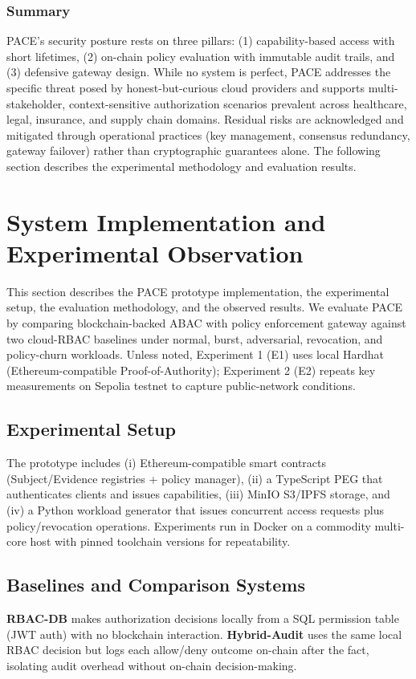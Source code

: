 \documentclass[pdflatex,sn-mathphys-num]{sn-jnl}
\begin{document}
\subsubsection{Summary}
PACE's security posture rests on three pillars: (1) capability-based access with short lifetimes, (2) on-chain policy evaluation with immutable audit trails, and (3) defensive gateway design. While no system is perfect, PACE addresses the specific threat posed by honest-but-curious cloud providers and supports multi-stakeholder, context-sensitive authorization scenarios prevalent across healthcare, legal, insurance, and supply chain domains. Residual risks are acknowledged and mitigated through operational practices (key management, consensus redundancy, gateway failover) rather than cryptographic guarantees alone. The following section describes the experimental methodology and evaluation results.


\section{System Implementation and Experimental Observation}
\label{sec:implementation-and-observation}

This section describes the PACE prototype implementation, the experimental setup, the evaluation methodology, and the observed results. We evaluate PACE by comparing blockchain-backed ABAC with policy enforcement gateway against two cloud-RBAC baselines under normal, burst, adversarial, revocation, and policy-churn workloads. Unless noted, Experiment 1 (E1) uses local Hardhat (Ethereum-compatible Proof-of-Authority); Experiment 2 (E2) repeats key measurements on Sepolia testnet to capture public-network conditions.

\subsection{Experimental Setup}
The prototype includes (i) Ethereum-compatible smart contracts (Subject/Evidence registries + policy manager), (ii) a TypeScript PEG that authenticates clients and issues capabilities, (iii) MinIO S3/IPFS storage, and (iv) a Python workload generator that issues concurrent access requests plus policy/revocation operations. Experiments run in Docker on a commodity multi-core host with pinned toolchain versions for repeatability.

\subsection{Baselines and Comparison Systems}
\textbf{RBAC-DB} makes authorization decisions locally from a SQL permission table (JWT auth) with no blockchain interaction. \textbf{Hybrid-Audit} uses the same local RBAC decision but logs each allow/deny outcome on-chain after the fact, isolating audit overhead without on-chain decision-making.
\end{document}
